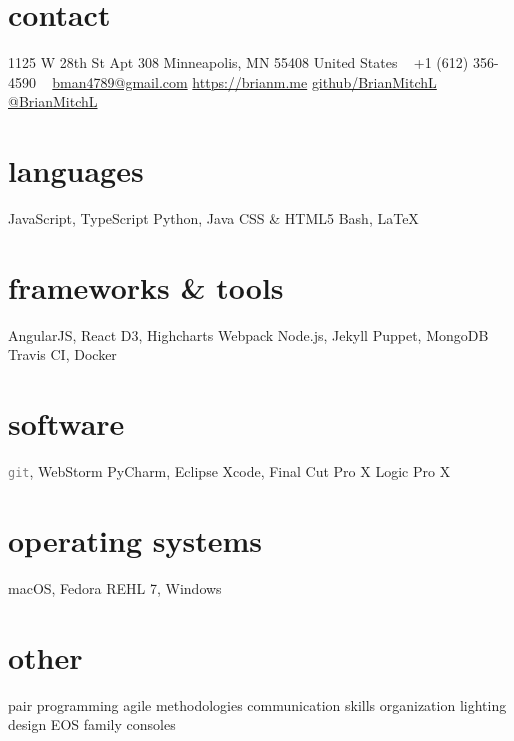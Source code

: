 \documentclass[]{cv-style} %
\begin{document}
\lastupdated


\begin{aside} %
\section{contact}
1125 W 28th St
Apt 308
Minneapolis, MN 55408
United States
~
+1 (612) 356-4590
~
\href{mailto:bman4789@gmail.com}{bman4789@gmail.com}
\href{https://brianm.me}{https://brianm.me}
\href{https://github.com/BrianMitchL}{\textcolor{darkgray}{ }github/BrianMitchL}
\href{https://twitter.com/BrianMitchL}{\textcolor{twitter}{ }@BrianMitchL}
\section{languages}
JavaScript, TypeScript
Python, Java
CSS \& HTML5
Bash, \LaTeX
\section{frameworks \& tools}
AngularJS, React
D3, Highcharts
Webpack
Node.js, Jekyll
Puppet, MongoDB
Travis CI, Docker
\section{software}
\textcolor{gray}{\texttt{git}}, WebStorm
PyCharm, Eclipse
Xcode, Final Cut Pro X
Logic Pro X
\section{operating systems}
macOS, Fedora
REHL 7, Windows
\section{other}
pair programming
agile methodologies
communication skills
organization
lighting design
EOS family consoles
\end{aside}

\vspace{0.2cm}
\end{document}
